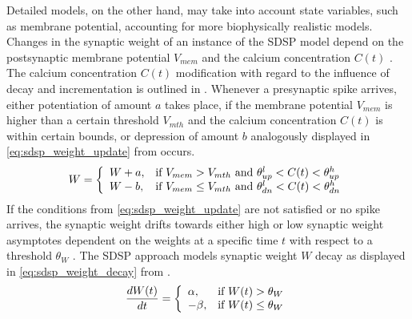 Detailed models, on the other hand, may take into account state variables, such as membrane potential, 
accounting for more biophysically realistic models.
Changes in the synaptic weight of an instance of the \ac{SDSP} model depend on the postsynaptic membrane potential $V_{mem}$ and 
the calcium concentration $C(t)$ \cite{Synaptic_plasticity}.
The calcium concentration $C(t)$  modification with regard to the influence of decay and incrementation is outlined in \cite{simulation_STDP}.
Whenever a presynaptic spike arrives, either potentiation of amount $a$ takes place, 
if the membrane potential $V_{mem}$ is higher than a certain threshold $V_{mth}$ and the 
calcium concentration $C(t)$ is within certain bounds, 
or depression of amount $b$ analogously displayed in \autoref{eq:sdsp_weight_update} from \cite{Synaptic_plasticity} occurs.
%
\begin{equation}
    \centering
    \label{eq:sdsp_weight_update} 
    W = 
    \left\{
    \begin{array}{ll}
        W + a, & \text{if } V_{mem} > V_{mth} \text{ and } \theta^l_{up} < C(t) < \theta^h_{up}\\
        W - b, & \text{if } V_{mem} \le V_{mth} \text{ and } \theta^l_{dn} < C(t) < \theta^h_{dn}
    \end{array}
    \right.
\end{equation}
%
If the conditions from \autoref{eq:sdsp_weight_update} are not satisfied or no spike arrives, 
the synaptic weight drifts towards either high or low synaptic weight asymptotes dependent on the weights at a specific time $t$ 
with respect to a threshold $\theta_W$ \cite{Synaptic_plasticity}.
The \ac{SDSP} approach models synaptic weight $W$ decay as displayed in \autoref{eq:sdsp_weight_decay} from \cite{Synaptic_plasticity}.
%
\begin{equation}
    \centering
    \label{eq:sdsp_weight_decay}
    \frac{dW(t)}{dt} = 
    \left\{
    \begin{array}{ll}
        \alpha, & \text{if } W(t) > \theta_W\\
        - \beta, & \text{if } W(t) \le \theta_W\\
    \end{array}
    \right.
\end{equation}


